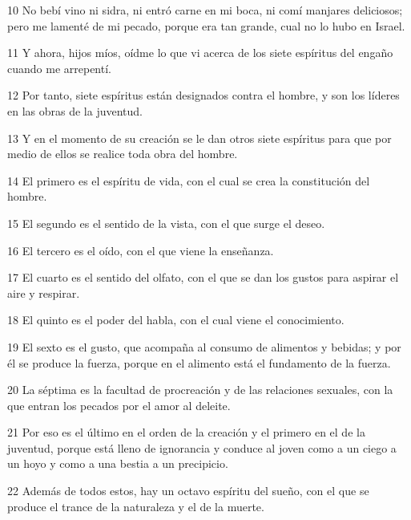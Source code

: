\par 10 No bebí vino ni sidra, ni entró carne en mi boca, ni comí manjares deliciosos; pero me lamenté de mi pecado, porque era tan grande, cual no lo hubo en Israel.

\par 11 Y ahora, hijos míos, oídme lo que vi acerca de los siete espíritus del engaño cuando me arrepentí.

\par 12 Por tanto, siete espíritus están designados contra el hombre, y son los líderes en las obras de la juventud.

\par 13 Y en el momento de su creación se le dan otros siete espíritus para que por medio de ellos se realice toda obra del hombre.

\par 14 El primero es el espíritu de vida, con el cual se crea la constitución del hombre.

\par 15 El segundo es el sentido de la vista, con el que surge el deseo.

\par 16 El tercero es el oído, con el que viene la enseñanza.

\par 17 El cuarto es el sentido del olfato, con el que se dan los gustos para aspirar el aire y respirar.

\par 18 El quinto es el poder del habla, con el cual viene el conocimiento.

\par 19 El sexto es el gusto, que acompaña al consumo de alimentos y bebidas; y por él se produce la fuerza, porque en el alimento está el fundamento de la fuerza.

\par 20 La séptima es la facultad de procreación y de las relaciones sexuales, con la que entran los pecados por el amor al deleite.

\par 21 Por eso es el último en el orden de la creación y el primero en el de la juventud, porque está lleno de ignorancia y conduce al joven como a un ciego a un hoyo y como a una bestia a un precipicio.

\par 22 Además de todos estos, hay un octavo espíritu del sueño, con el que se produce el trance de la naturaleza y el de la muerte.

